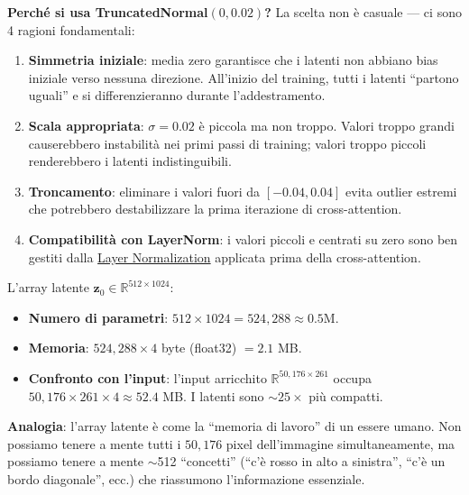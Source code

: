 \documentclass[12pt,a4paper]{article}
\begin{document}
\textbf{Perch\'e si usa TruncatedNormal$(0, 0.02)$?} La scelta non \`e casuale --- ci sono 4 ragioni fondamentali:
\begin{enumerate}
    \item \textbf{Simmetria iniziale}: media zero garantisce che i latenti non abbiano bias iniziale verso nessuna direzione. All'inizio del training, tutti i latenti ``partono uguali'' e si differenzieranno durante l'addestramento.
    \item \textbf{Scala appropriata}: $\sigma = 0.02$ \`e piccola ma non troppo. Valori troppo grandi causerebbero instabilit\`a nei primi passi di training; valori troppo piccoli renderebbero i latenti indistinguibili.
    \item \textbf{Troncamento}: eliminare i valori fuori da $[-0.04, 0.04]$ evita outlier estremi che potrebbero destabilizzare la prima iterazione di cross-attention.
    \item \textbf{Compatibilit\`a con LayerNorm}: i valori piccoli e centrati su zero sono ben gestiti dalla \hyperref[sec:layernorm]{Layer Normalization} applicata prima della cross-attention.
\end{enumerate}

\begin{examplebox}
L'array latente $\mathbf{z}_0 \in \mathbb{R}^{512 \times 1024}$:
\begin{itemize}
    \item \textbf{Numero di parametri}: $512 \times 1024 = 524{,}288 \approx 0.5$M.
    \item \textbf{Memoria}: $524{,}288 \times 4$ byte (float32) $= 2.1$ MB.
    \item \textbf{Confronto con l'input}: l'input arricchito $\mathbb{R}^{50{,}176 \times 261}$ occupa $50{,}176 \times 261 \times 4 \approx 52.4$ MB. I latenti sono $\sim 25\times$ pi\`u compatti.
\end{itemize}

\textbf{Analogia}: l'array latente \`e come la ``memoria di lavoro'' di un essere umano. Non possiamo tenere a mente tutti i $50{,}176$ pixel dell'immagine simultaneamente, ma possiamo tenere a mente $\sim$512 ``concetti'' (``c'\`e rosso in alto a sinistra'', ``c'\`e un bordo diagonale'', ecc.) che riassumono l'informazione essenziale.
\end{examplebox}
\end{document}
